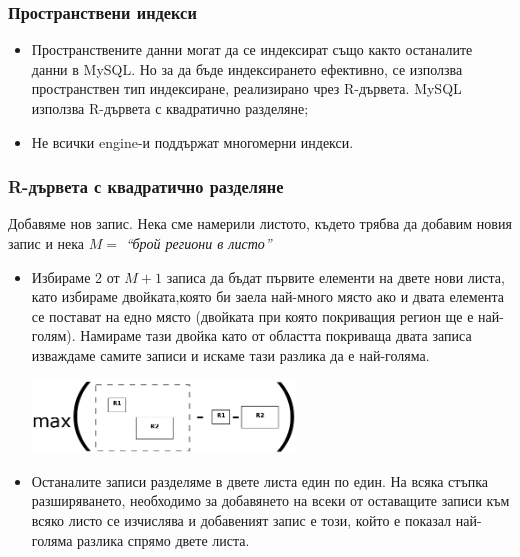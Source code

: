 \documentclass{beamer}
\begin{document}
\begin{frame}
 \frametitle{Пространствени индекси}
\begin{itemize}
\item Пространствените данни могат да се индексират също както останалите данни в MySQL. Но за да бъде 
индексирането ефективно, се използва пространствен тип индексиране, реализирано чрез R-дървета. 
MySQL използва \alert{R-дървета с квадратично разделяне};
\item Не всички engine-и поддържат многомерни индекси.
\end{itemize}
\end{frame}

\begin{frame}
\frametitle{R-дървета с квадратично разделяне}
Добавяме нов запис.
Нека сме намерили листото, където трябва да добавим новия запис и 
нека $M = $ \textit{``брой региони в листо''}
\begin{itemize}
\item Избираме 2 от $M+1$ записа да бъдат първите елементи на двете нови листа, като избираме двойката,която би заела
най-много място ако и двата елемента се постават на едно място (двойката при която покриващия регион ще е най-голям).
Намираме тази двойка като от областта покриваща двата записа изваждаме самите записи и искаме тази разлика да е най-голяма.
\begin{center}
\includegraphics[width=70mm]{Diagram1.png}\end{center}
\end{itemize}
\end{frame}

\begin{frame}
\begin{itemize}
\item Останалите записи разделяме в двете листа един по един.
На всяка стъпка разширяването, необходимо за добавянето на всеки от оставащите записи към всяко листо се изчислява
и добавеният запис е този, който е показал най-голяма разлика спрямо двете листа.
\end{itemize}
\end{frame}
\end{document}
